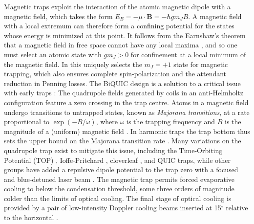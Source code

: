 	Magnetic traps exploit the interaction of the atomic magnetic dipole with a magnetic field, which takes the form $E_B = -\mu\cdot \textbf{B} = -\hbar g m_J B$.
	A magnetic field with a local extremum can therefore form a confining potential for the states whose energy is minimized at this point.
	It follows from the Earnshaw's theorem that a magnetic field in free space cannot have any local maxima \cite{Harms00,MakingProbingUnderstanding}, and so one must select an atomic state with $g m_J>0$ for confinement at a local minimum of the magnetic field.
	In \mhe this uniquely selects the $m_J=+1$ state for magnetic trapping, which also ensures complete spin-polarization and the attendant reduction in Penning losses.
	The BiQUIC design is a solution to a critical issue with early traps \cite{Migdall85}: The quadrupole fields generated by coils in an anti-Helmholtz configuration feature a zero crossing in the trap centre.
	Atoms in a magnetic field undergo transitions to untrapped states, known as \emph{Majorana transitions}, at a rate proportional to $\exp(-B/\omega)$, where $\omega$ is the trapping frequency and $B$ is the magnitude of a (uniform) magnetic field \cite{Sukumar97}.
	In harmonic traps the trap bottom thus sets the upper bound on the Majorana transition rate \cite{Brink06}.
	Many variations on the quadrupole trap exist to mitigate this issue, including the Time-Orbiting Potential (TOP) \cite{Petrich95}, Ioffe-Pritchard \cite{Pritchard83}, cloverleaf \cite{Mewes96}, and QUIC \cite{Esslinger98} traps, while other groups have added a repulsive dipole potential to the trap zero with a focused and blue-detuned laser beam \cite{Davis95}.
	The magnetic trap permits forced evaporative cooling to below the condensation threshold, some three orders of magnitude colder than the limits of optical cooling. 
	The final stage of optical cooling is provided by a pair of low-intensity Doppler cooling beams inserted at 15$^\circ$ relative to the horizontal \cite{Dall07_BEC}.

